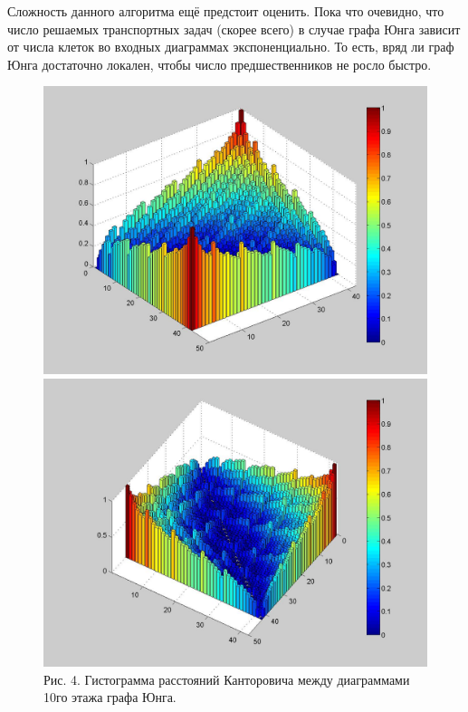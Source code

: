 \documentclass[12pt]{report}
\begin{document}
Сложность данного алгоритма ещё предстоит оценить. Пока что очевидно, что число решаемых транспортных задач (скорее всего) в случае графа Юнга зависит от числа клеток во входных диаграммах экспоненциально. То есть, вряд ли граф Юнга достаточно локален, чтобы число предшественников не росло быстро. 

\begin{figure}[!ht]
\begin{center}
\includegraphics[scale=0.2]{metricHist1}
\includegraphics[scale=0.2]{metricHist2}
\\Рис. 4. Гистограмма расстояний Канторовича между диаграммами 10го этажа графа Юнга. 
\end{center}
\end{figure}
\end{document}
